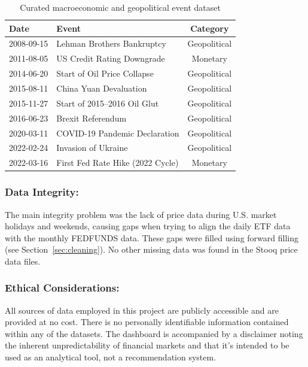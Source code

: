 \documentclass[12pt]{article}
\begin{document}
\begin{table}[H]
\centering
\caption{Curated macroeconomic and geopolitical event dataset}
\label{tab:events}
\begin{tabular}{llc}
\toprule
\textbf{Date} & \textbf{Event} & \textbf{Category} \\
\midrule
2008-09-15 & Lehman Brothers Bankruptcy          & Geopolitical \\
2011-08-05 & US Credit Rating Downgrade          & Monetary     \\
2014-06-20 & Start of Oil Price Collapse         & Geopolitical \\
2015-08-11 & China Yuan Devaluation              & Geopolitical \\
2015-11-27 & Start of 2015--2016 Oil Glut        & Geopolitical \\
2016-06-23 & Brexit Referendum                   & Geopolitical \\
2020-03-11 & COVID-19 Pandemic Declaration       & Geopolitical \\
2022-02-24 & Invasion of Ukraine                 & Geopolitical \\
2022-03-16 & First Fed Rate Hike (2022 Cycle)    & Monetary     \\
\bottomrule
\end{tabular}
\end{table}

\subsubsection{Data Integrity:} The main integrity problem was the lack of price data during U.S. market holidays and weekends, causing gaps when trying to align the daily ETF data with the monthly FEDFUNDS data. These gaps were filled using forward filling (see Section~\ref{sec:cleaning}). No other missing data was found in the Stooq price data files.


\subsubsection{Ethical Considerations:} All sources of data employed in this project are publicly accessible and are provided at no cost. There is no personally identifiable information contained within any of the datasets. The dashboard is accompanied by a disclaimer noting the inherent unpredictability of financial markets and that it's intended to be used as an analytical tool, not a recommendation system.
\end{document}
